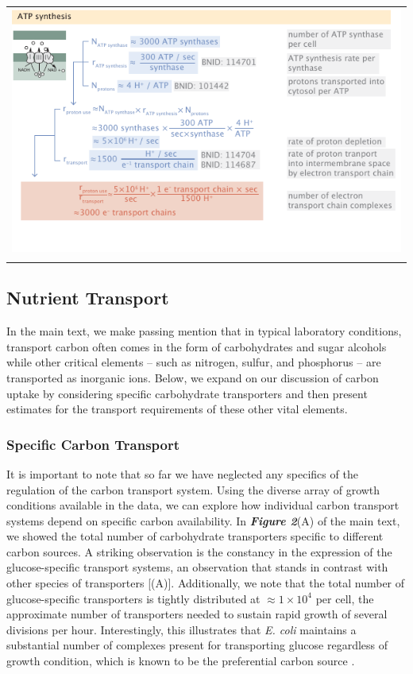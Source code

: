 \begin{longtable}{c}
\includegraphics{SI_estimates/echain.pdf}  \\
\label{tab:estimates}
\end{longtable}


\subsection{Nutrient Transport}
In the main text, we make passing mention that in typical laboratory conditions,
transport carbon often comes in the form of carbohydrates and sugar alcohols
while other critical elements -- such as nitrogen, sulfur, and phosphorus -- are
transported as inorganic ions. Below, we expand on our discussion of carbon uptake by
considering specific carbohydrate transporters and then present estimates for the transport
requirements of these other vital elements.

\subsubsection{Specific Carbon Transport}
It is important to note that so far we have neglected any specifics of the
regulation of the carbon transport system. Using the diverse array of growth
conditions available in the data, we can explore how individual carbon transport
systems depend on specific carbon availability. In
\textbf{\textit{Figure 2}}(A) of the main text, we showed the total number of
carbohydrate transporters specific to different carbon sources. A striking
observation is the  constancy in the expression of the glucose-specific
transport systems, an observation that stands in contrast with other species of
transporters [(A)]. Additionally, we note that the
total number of glucose-specific transporters is tightly distributed at $\approx
1\times 10^4$ per cell, the approximate number of transporters needed to sustain
rapid growth of several divisions per hour. Interestingly, this illustrates that
\textit{E. coli} maintains a substantial number of complexes present for
transporting glucose regardless of growth condition, which is known to be the
preferential carbon source \citep{monod1947, liu2005a, aidelberg2014}.

